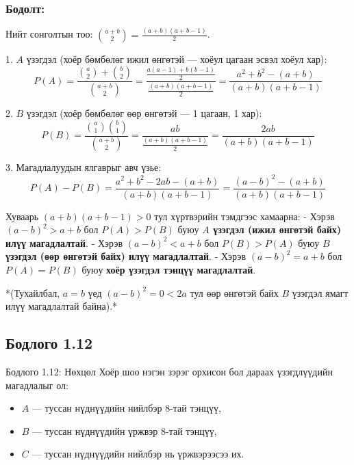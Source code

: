 \documentclass[11pt,a4paper]{article}
\begin{document}
\subsubsection*{Бодолт:}

Нийт сонголтын тоо: $\binom{a+b}{2} = \frac{(a+b)(a+b-1)}{2}$.

1. $A$ үзэгдэл (хоёр бөмбөлөг ижил өнгөтэй — хоёул цагаан эсвэл хоёул хар):
   \[
     P(A) = \frac{\binom{a}{2} + \binom{b}{2}}{\binom{a+b}{2}} = \frac{\frac{a(a-1) + b(b-1)}{2}}{\frac{(a+b)(a+b-1)}{2}} = \frac{a^2 + b^2 - (a+b)}{(a+b)(a+b-1)}
   \]

2. $B$ үзэгдэл (хоёр бөмбөлөг өөр өнгөтэй — 1 цагаан, 1 хар):
   \[
     P(B) = \frac{\binom{a}{1}\binom{b}{1}}{\binom{a+b}{2}} = \frac{ab}{\frac{(a+b)(a+b-1)}{2}} = \frac{2ab}{(a+b)(a+b-1)}
   \]

3. Магадлалуудын ялгаврыг авч үзье:
   \[
     P(A) - P(B) = \frac{a^2 + b^2 - 2ab - (a+b)}{(a+b)(a+b-1)} = \frac{(a - b)^2 - (a + b)}{(a+b)(a+b-1)}
   \]

Хуваарь $(a+b)(a+b-1) > 0$ тул хүртвэрийн тэмдгээс хамаарна:
- Хэрэв 				\textbf{$(a - b)^2 > a + b$} бол $P(A) > P(B)$ буюу 				\textbf{$A$ үзэгдэл (ижил өнгөтэй байх) илүү магадлалтай}.
- Хэрэв 				\textbf{$(a - b)^2 < a + b$} бол $P(B) > P(A)$ буюу 				\textbf{$B$ үзэгдэл (өөр өнгөтэй байх) илүү магадлалтай}.
- Хэрэв 				\textbf{$(a - b)^2 = a + b$} бол $P(A) = P(B)$ буюу 				\textbf{хоёр үзэгдэл тэнцүү магадлалтай}.

*(Тухайлбал, $a = b$ үед $(a-b)^2 = 0 < 2a$ тул өөр өнгөтэй байх $B$ үзэгдэл ямагт илүү магадлалтай байна).*

\vspace{0.8em}

\subsection*{Бодлого 1.12}

\begin{problembox}{Бодлого 1.12: Нөхцөл}
Хоёр шоо нэгэн зэрэг орхисон бол дараах үзэгдлүүдийн магадлалыг ол:
\begin{itemize}[leftmargin=1.8em, itemsep=1pt]
  \item $A$ — туссан нүднүүдийн нийлбэр 8-тай тэнцүү,
  \item $B$ — туссан нүднүүдийн үржвэр 8-тай тэнцүү,
  \item $C$ — туссан нүднүүдийн нийлбэр нь үржвэрээсээ их.
\end{itemize}
\end{problembox}
\end{document}
